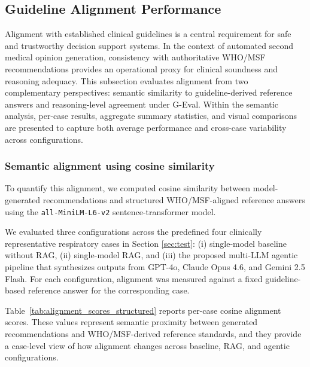 \documentclass[preprint,12pt]{elsarticle}
\begin{document}
\subsection{Guideline Alignment Performance}

Alignment with established clinical guidelines is a central requirement for safe and trustworthy decision support systems. In the context of automated second medical opinion generation, consistency with authoritative WHO/MSF recommendations provides an operational proxy for clinical soundness and reasoning adequacy. This subsection evaluates alignment from two complementary perspectives: semantic similarity to guideline-derived reference answers and reasoning-level agreement under G-Eval. Within the semantic analysis, per-case results, aggregate summary statistics, and visual comparisons are presented to capture both average performance and cross-case variability across configurations.

\subsubsection{Semantic alignment using cosine similarity}

To quantify this alignment, we computed cosine similarity between model-generated recommendations and structured WHO/MSF-aligned reference answers using the \texttt{all-MiniLM-L6-v2} sentence-transformer model.

We evaluated three configurations across the predefined four clinically representative respiratory cases in Section \ref{sec:test}: (i) single-model baseline without RAG, (ii) single-model RAG, and (iii) the proposed multi-LLM agentic pipeline that synthesizes outputs from GPT-4o, Claude Opus 4.6, and Gemini 2.5 Flash. For each configuration, alignment was measured against a fixed guideline-based reference answer for the corresponding case.

Table~\ref{tab:alignment_scores_structured} reports per-case cosine alignment scores. These values represent semantic proximity between generated recommendations and WHO/MSF-derived reference standards, and they provide a case-level view of how alignment changes across baseline, RAG, and agentic configurations.
\end{document}

